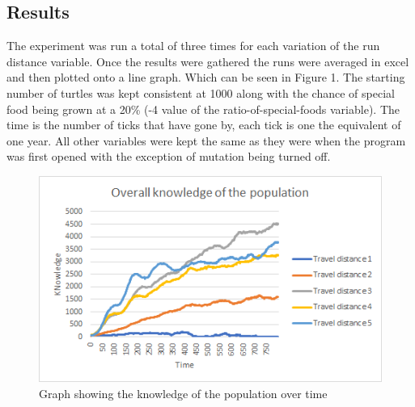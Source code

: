 \documentclass[12pt, letterpaper]{article}
\begin{document}
\begin{multicols}{2}
\section{Results}
The experiment was run a total of three times for each variation of the run distance variable. Once the results were gathered the runs were averaged in excel and then plotted onto a line graph. Which can be seen in Figure 1. The starting number of turtles was kept consistent at 1000 along with the chance of special food being grown at a 20\% (-4 value of the ratio-of-special-foods variable). The time is the number of ticks that have gone by, each tick is one the equivalent of one year. All other variables were kept the same as they were when the program was first opened with the exception of mutation being turned off.
\begin{figure}[H]
\centering
\includegraphics[width=\columnwidth]{KnowledgeGraph}
\caption{Graph showing the knowledge of the population over time}
\end{figure}

\end{multicols}
\end{document}
